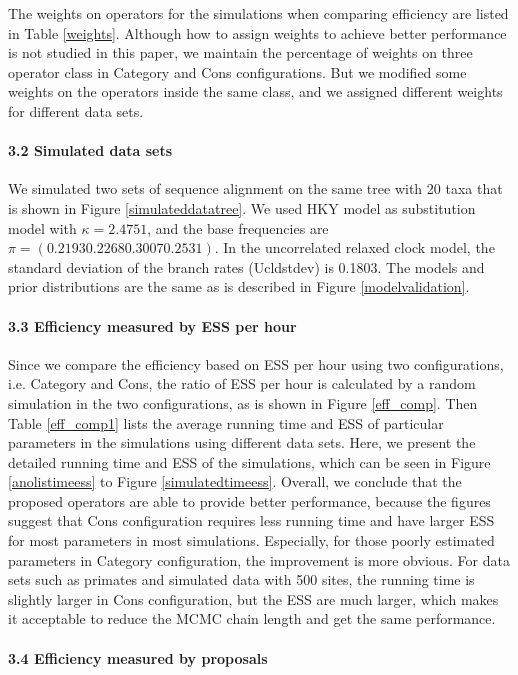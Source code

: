\documentclass{bmcart}
\begin{document}
\begin{backmatter}
The weights on operators for the simulations when comparing efficiency are listed in Table \ref{weights}. Although how to assign weights to achieve better performance is not studied in this paper, we maintain the percentage of weights on three operator class in Category and Cons configurations. But we modified some weights on the operators inside the same class, and we assigned different weights for different data sets.

\paragraph*{3.2 Simulated data sets}
We simulated two sets of sequence alignment on the same tree with 20 taxa that is shown in Figure \ref{simulateddatatree}. We used HKY model as substitution model with $\kappa = 2.4751$, and the base frequencies are $\pi = (0.2193 0.2268 0.3007 0.2531)$. In the uncorrelated relaxed clock model, the standard deviation of the branch rates (Ucldstdev) is 0.1803. The models and prior distributions are the same as is described in Figure \ref{modelvalidation}.

\paragraph*{3.3 Efficiency measured by ESS per hour}

Since we compare the efficiency based on ESS per hour using two configurations, i.e. Category and Cons, the ratio of ESS per hour is calculated by a random simulation in the two configurations, as is shown in Figure \ref{eff_comp}. Then Table \ref{eff_comp1} lists the average running time and ESS of particular parameters in the simulations using different data sets. Here, we present the detailed running time and ESS of the simulations, which can be seen in Figure \ref{anolistimeess} to Figure \ref{simulatedtimeess}. Overall, we conclude that the proposed operators are able to provide better performance, because the figures suggest that Cons configuration requires less running time and have larger ESS for most parameters in most simulations. Especially, for those poorly estimated parameters in Category configuration, the improvement is more obvious. For data sets such as primates and simulated data with 500 sites, the running time is slightly larger in Cons configuration, but the ESS are much larger, which makes it acceptable to reduce the MCMC chain length and get the same performance.

\paragraph*{3.4 Efficiency measured by proposals}


\end{backmatter}
\end{document}
